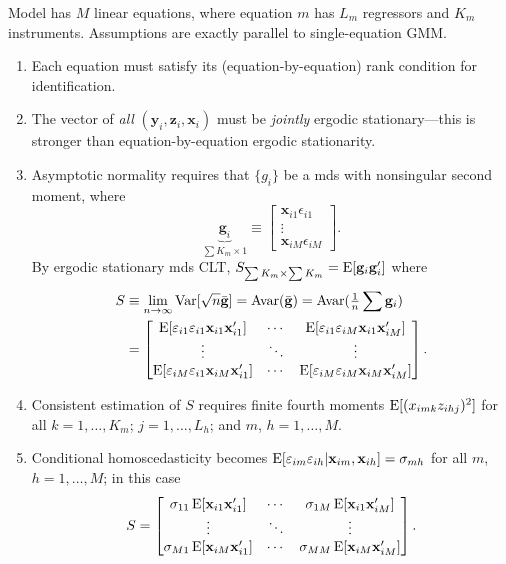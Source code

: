 \documentclass[8pt,letterpaper, landscape]{extarticle} %
\newcommand{\mx}{\ensuremath{\mathbf{x}}}
\begin{document}
\begin{multicols}{3}
\begin{description}
Model has $ M $ linear equations, where equation $ m $ has $ L_m $ regressors and $ K_m $ instruments. Assumptions are exactly parallel to single-equation GMM.
\begin{enumerate}
\item Each equation must satisfy its (equation-by-equation) rank condition for identification.
\item The vector of \textit{all} $ (\mathbf{y}_i , \mathbf{z}_i , \mx_i ) $ must be \textit{jointly} ergodic stationary---this is stronger than equation-by-equation ergodic stationarity.
\item Asymptotic normality requires that $ \{ g_i \} $ be a mds with nonsingular second moment, where
\[ \underbrace{\mathbf{g}_i}_{\sum K_m \times 1} \equiv \begin{bmatrix}
\mx_{i1} \epsilon_{i1} \\
\vdots \\
\mx_{iM} \epsilon_{iM}
\end{bmatrix}. \]
By ergodic stationary mds CLT, $ S_{\sum K_m \times \sum K_m} = \operatorname{E} [\mathbf{g}_i \mathbf{g}_{i}'] $ where
\begin{align*}
S &\equiv \lim_{n \to \infty} \Var [\sqrt{n} \bar{\mathbf{g}}] = \Avar (\bar{\mathbf{g}}) = \Avar (\tfrac{1}{n} \sum \mathbf{g}_i ) \\
&= \begin{bmatrix}
\E [\epsilon_{i1} \epsilon_{i1} \mx_{i1} \mx_{i1}'] & \cdots & \E [\epsilon_{i1} \epsilon_{iM} \mx_{i1} \mx_{iM}']  \\
\vdots & \ddots & \vdots \\
\E [\epsilon_{iM} \epsilon_{i1} \mx_{iM} \mx_{i1}'] & \cdots & \E [\epsilon_{iM} \epsilon_{iM} \mx_{iM} \mx_{iM}']
\end{bmatrix}.
\end{align*}
\item Consistent estimation of $ S $ requires finite fourth moments $ \operatorname{E} [(x_{imk} z_{ihj})^{2}] $ for all $ k = 1, \dotsc , K_m $; $ j = 1 , \dotsc , L_h $; and $ m $, $ h = 1, \dotsc , M $.
\item Conditional homoscedasticity becomes $ \E [\epsilon_{im} \epsilon_{ih} | \mx_{im}, \mx_{ih}] = \sigma_{mh} $ for all $ m $, $ h = 1, \dotsc , M $; in this case
$$
S = \begin{bmatrix}
\sigma_{11} \E [\mx_{i1} \mx_{i1}'] & \cdots & \sigma_{1M} \E [\mx_{i1} \mx_{iM}']  \\
\vdots & \ddots & \vdots \\
\sigma_{M1} \E [\mx_{iM} \mx_{i1}'] & \cdots & \sigma_{MM} \E [\mx_{iM} \mx_{iM}']
\end{bmatrix}.
$$
\end{enumerate} 


\end{description}
\end{multicols}
\end{document}
